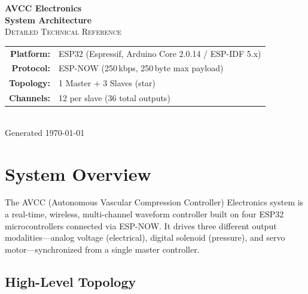 \documentclass[11pt,a4paper]{article}
\begin{document}
\begin{titlepage}
\centering
\vspace*{2cm}
{\Huge\bfseries AVCC Electronics\\[0.3cm]System Architecture}\\[1.5cm]
{\Large\textsc{Detailed Technical Reference}}\\[2cm]
{\large
\begin{tabular}{rl}
\textbf{Platform:}    & ESP32 (Espressif, Arduino Core 2.0.14 / ESP-IDF 5.x) \\
\textbf{Protocol:}    & ESP-NOW (250\,kbps, 250\,byte max payload) \\
\textbf{Topology:}    & 1 Master + 3 Slaves (star) \\
\textbf{Channels:}    & 12 per slave (36 total outputs) \\
\end{tabular}
}\\[3cm]
\vfill
{\small Generated \today}
\end{titlepage}

\tableofcontents
\newpage

\section{System Overview}

The AVCC (Autonomous Vascular Compression Controller) Electronics system is a
real-time, wireless, multi-channel waveform controller built on four ESP32
microcontrollers connected via ESP-NOW. It drives three different output
modalities---analog voltage (electrical), digital solenoid (pressure), and
servo motor---synchronized from a single master controller.

\subsection{High-Level Topology}
\end{document}
